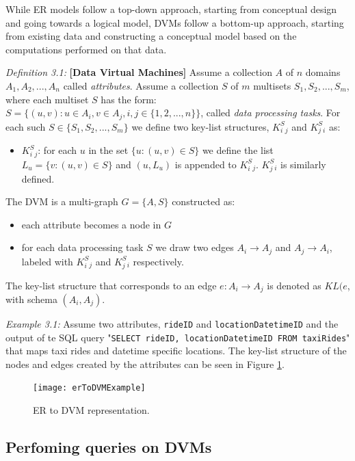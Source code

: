 While ER models follow a top-down approach, starting from conceptual design and going towards a logical model, DVMs follow a bottom-up approach, starting from existing data and constructing a conceptual model based on the computations performed on that data\cite{chatziantoniou}.

\textit{Definition 3.1:} \textbf{[Data Virtual Machines]} Assume a collection \(A\) of \(n\) domains \(A_1, A_2, ..., A_n\) called \textit{attributes}. Assume a collection \(S\) of \(m\) multisets \(S_1, S_2, ..., S_m\), where each multiset \(S\) has the form: \(S = \{(u, v): u \in A_i, v \in A_j, i, j \in \{1, 2, ..., n\}\}\), called \textit{data processing tasks}. For each such \(S \in \{S_1, S_2, ..., S_m\}\) we define two key-list structures, \(K^S_i_j\) and \(K^S_j_i\) as:
\begin{itemize}
    \item[] \(K^S_i_j\): for each \(u\) in the set \(\{u: (u, v) \in S\}\) we define the list \(L_u = \{v: (u, v) \in S\}\) and \((u, L_u)\) is appended to \(K^S_i_j\). \(K^S_j_i\) is similarly defined.
\end{itemize}
The DVM is a multi-graph \(G = \{A, S\}\) constructed as:
\begin{itemize}
    \item each attribute becomes a node in \(G\)
    \item for each data processing task \(S\) we draw two edges \(A_i \to A_j\) and \(A_j \to A_i\), labeled with \(K^S_i_j\) and \(K^S_j_i\) respectively.
\end{itemize}
The key-list structure that corresponds to an edge \(e: A_i \to A_j\) is denoted as \(KL(e\), with schema \((A_i, A_j)\)\cite{chatziantoniou}.

\textit{Example 3.1:} Assume two attributes, \texttt{rideID} and \texttt{locationDatetimeID} and the output of te SQL query "\texttt{SELECT rideID, locationDatetimeID FROM taxiRides}" that maps taxi rides and datetime specific locations. The key-list structure of the nodes and edges created by the attributes can be seen in Figure \ref{dvm1}.

\begin{center}
    \begin{figure}[h]
        \texttt{[image: erToDVMExample]}
        \caption{ER to DVM representation.}
        \label{dvm1}
    \end{figure}
\end{center}

\subsection{Perfoming queries on DVMs}

